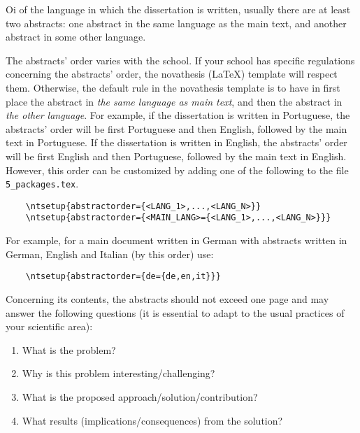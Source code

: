 
%

Oi of the language in which the dissertation is written, usually there are at least two abstracts: one abstract in the same language as the main text, and another abstract in some other language.

The abstracts' order varies with the school.  If your school has specific regulations concerning the abstracts' order, the \gls{novathesis} (\LaTeX) template will respect them.  Otherwise, the default rule in the \gls{novathesis} template is to have in first place the abstract in \emph{the same language as main text}, and then the abstract in \emph{the other language}. For example, if the dissertation is written in Portuguese, the abstracts' order will be first Portuguese and then English, followed by the main text in Portuguese. If the dissertation is written in English, the abstracts' order will be first English and then Portuguese, followed by the main text in English.
%
However, this order can be customized by adding one of the following to the file \verb+5_packages.tex+.

\begin{verbatim}
    \ntsetup{abstractorder={<LANG_1>,...,<LANG_N>}}
    \ntsetup{abstractorder={<MAIN_LANG>={<LANG_1>,...,<LANG_N>}}}
\end{verbatim}

For example, for a main document written in German with abstracts written in German, English and Italian (by this order) use:
\begin{verbatim}
    \ntsetup{abstractorder={de={de,en,it}}}
\end{verbatim}

Concerning its contents, the abstracts should not exceed one page and may answer the following questions (it is essential to adapt to the usual practices of your scientific area):

\begin{enumerate}
  \item What is the problem?
  \item Why is this problem interesting/challenging?
  \item What is the proposed approach/solution/contribution?
  \item What results (implications/consequences) from the solution?
\end{enumerate}

